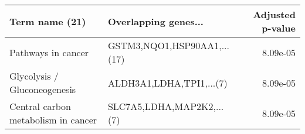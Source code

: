 \begin{tabular}{llr}
\toprule
                     Term name (21) &        Overlapping genes... &  Adjusted p-value \\
\midrule
                 Pathways in cancer & GSTM3,NQO1,HSP90AA1,...(17) &          8.09e-05 \\
       Glycolysis / Gluconeogenesis &    ALDH3A1,LDHA,TPI1,...(7) &          8.09e-05 \\
Central carbon metabolism in cancer &   SLC7A5,LDHA,MAP2K2,...(7) &          8.09e-05 \\
\bottomrule
\end{tabular}
